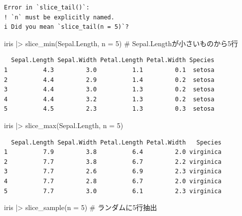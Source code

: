 \documentclass[
  letterpaper,
  DIV=11,
  numbers=noendperiod]{scrreprt}
\newenvironment{Shaded}{\begin{snugshade}}{\end{snugshade}}
\newcommand{\AttributeTok}[1]{\textcolor[rgb]{0.40,0.45,0.13}{#1}}
\newcommand{\CommentTok}[1]{\textcolor[rgb]{0.37,0.37,0.37}{#1}}
\newcommand{\DecValTok}[1]{\textcolor[rgb]{0.68,0.00,0.00}{#1}}
\newcommand{\FunctionTok}[1]{\textcolor[rgb]{0.28,0.35,0.67}{#1}}
\newcommand{\NormalTok}[1]{\textcolor[rgb]{0.00,0.23,0.31}{#1}}
\newcommand{\SpecialCharTok}[1]{\textcolor[rgb]{0.37,0.37,0.37}{#1}}
\begin{document}
\begin{verbatim}
Error in `slice_tail()`:
! `n` must be explicitly named.
i Did you mean `slice_tail(n = 5)`?
\end{verbatim}

\begin{Shaded}
\begin{Highlighting}[]
\NormalTok{iris }\SpecialCharTok{|\textgreater{}} \FunctionTok{slice\_min}\NormalTok{(Sepal.Length, }\AttributeTok{n =} \DecValTok{5}\NormalTok{) }\CommentTok{\# Sepal.Lengthが小さいものから5行}
\end{Highlighting}
\end{Shaded}

\begin{verbatim}
  Sepal.Length Sepal.Width Petal.Length Petal.Width Species
1          4.3         3.0          1.1         0.1  setosa
2          4.4         2.9          1.4         0.2  setosa
3          4.4         3.0          1.3         0.2  setosa
4          4.4         3.2          1.3         0.2  setosa
5          4.5         2.3          1.3         0.3  setosa
\end{verbatim}

\begin{Shaded}
\begin{Highlighting}[]
\NormalTok{iris }\SpecialCharTok{|\textgreater{}} \FunctionTok{slice\_max}\NormalTok{(Sepal.Length, }\AttributeTok{n =} \DecValTok{5}\NormalTok{)}
\end{Highlighting}
\end{Shaded}

\begin{verbatim}
  Sepal.Length Sepal.Width Petal.Length Petal.Width   Species
1          7.9         3.8          6.4         2.0 virginica
2          7.7         3.8          6.7         2.2 virginica
3          7.7         2.6          6.9         2.3 virginica
4          7.7         2.8          6.7         2.0 virginica
5          7.7         3.0          6.1         2.3 virginica
\end{verbatim}

\begin{Shaded}
\begin{Highlighting}[]
\NormalTok{iris }\SpecialCharTok{|\textgreater{}} \FunctionTok{slice\_sample}\NormalTok{(}\AttributeTok{n =} \DecValTok{5}\NormalTok{) }\CommentTok{\# ランダムに5行抽出}
\end{Highlighting}
\end{Shaded}
\end{document}

